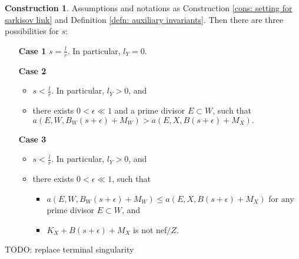 \documentclass[11pt]{amsart}
\numberwithin{equation}{section}
\theoremstyle{definition}
\theoremstyle{definition}
\newtheorem{cons}[thm]{Construction}
\theoremstyle{definition}
\begin{document}
\begin{cons}\label{cons: cases of sarkisov link with scaling}
Assumptions and notations as Construction \ref{cons: setting for sarkisov link} and Definition \ref{defn: auxiliary invariants}. Then there are three possibilities for $s$:
\begin{itemize}
   \item[\textbf{Case 1}] $s=\frac{l}{r}$. In particular, $l_Y=0.$
    \item[\textbf{Case 2}] 
    \begin{itemize}
        \item $s<\frac{l}{r}$. In particular, $l_Y>0$, and 
        \item there exists $0<\epsilon\ll 1$ and a prime divisor $E\subset W$, such that $a(E,W,B_W(s+\epsilon)+M_W)>a(E,X,B(s+\epsilon)+M_X).$
    \end{itemize}
        \item[\textbf{Case 3}] 
    \begin{itemize}
        \item $s<\frac{l}{r}$. In particular, $l_Y>0$, and 
        \item there exists $0<\epsilon\ll 1$, such that 
        \begin{itemize}
            \item $a(E,W,B_W(s+\epsilon)+M_W)\leq a(E,X,B(s+\epsilon)+M_X)$ for any prime divisor $E\subset W$, and
            \item $K_X+B(s+\epsilon)+M_X$ is not nef$/Z$.
        \end{itemize} 
    \end{itemize}
\end{itemize}
\end{cons}

TODO: replace terminal singularity
\end{document}
